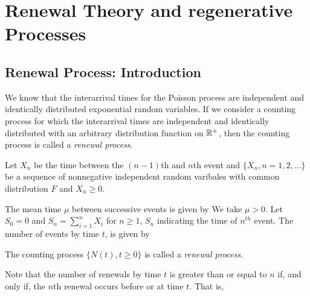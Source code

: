 \documentclass[all-lectures.tex]{subfiles}
\author{}
\begin{document}
\setcounter{chapter}{1}
\chapter{Renewal Theory and regenerative Processes}

\setcounter{section}{0}
\section*{}
\section{Renewal Process: Introduction}
We know that the interarrival times for the Poisson process are independent and identically distributed exponential random variables.
If we consider a counting process for which the interarrival times are independent and identically distributed with an arbitrary distribution function on $\mathbb{R}^+$, then the counting process is called a \textit{renewal process}.

Let $X_n$ be the time between the $(n-1)$th and $n$th event and $\{X_n,n=1,2,\dots\}$ be a sequence of nonnegative independent random varibales with common distribution $F$ and $X_n \ge 0$.

The mean time $\mu$ between successive events is given by
We take $\mu > 0$. Let $S_0=0$ and $S_n = \sum_{i=1}^{n} X_i$ for $n \ge 1$, $S_n$ indicating the time of $n^{th}$ event.
The number of events by time $t$, is given by

\begin{defn}
The counting process $\{ N(t),t \ge 0\}$ is called a \textit{renewal process}.
\end{defn}

Note that the number of renewals by time $t$ is greater than or equal to $n$ if, and only if, the $n$th renewal occurs before or at time $t$.
That is,
\end{document}
